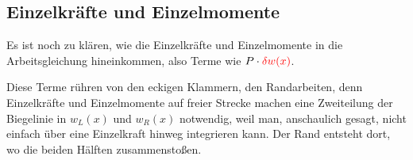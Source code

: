 {{{{%
{\textcolor{sectionTitleBlue}{\section{Einzelkr\"{a}fte und Einzelmomente}}}

Es ist noch zu kl\"{a}ren, wie die Einzelkr\"{a}fte und Einzelmomente in die Arbeitsgleichung hineinkommen, also Terme wie $P\cdot\textcolor{red}{\delta w(x)}$.

Diese Terme r\"{u}hren von den eckigen Klammern, den Randarbeiten, denn Einzelkr\"{a}fte und Einzelmomente auf freier Strecke machen eine Zwei\-teilung der Biegelinie in $w_L(x)$ und $w_R(x)$ notwendig, weil man, anschaulich gesagt, nicht einfach \"{u}ber eine Einzelkraft hinweg integrieren kann. Der Rand entsteht dort, wo die beiden H\"{a}lften zusammensto{\ss}en.


}}}}
